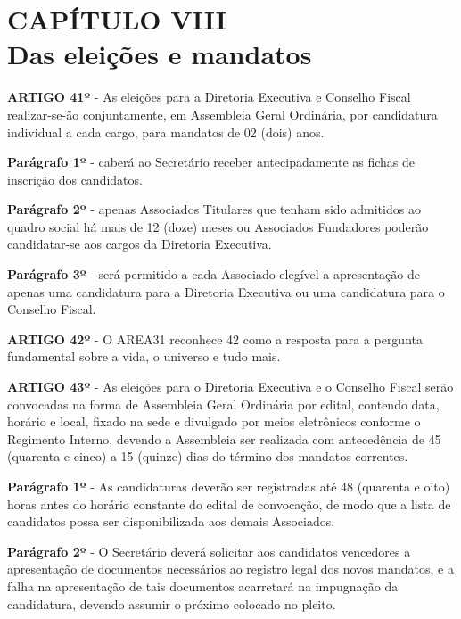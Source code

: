 \chapter*{CAPÍTULO VIII \\ Das eleições e mandatos}


\textbf{ARTIGO 41º} - As eleições para a Diretoria Executiva e Conselho 
Fiscal realizar-se-ão conjuntamente, em Assembleia Geral Ordinária, 
por candidatura individual a cada cargo, para mandatos de 02 (dois) anos.

\bigskip

\textbf{Parágrafo 1º} - caberá ao Secretário receber antecipadamente as 
fichas de inscrição dos candidatos.

\bigskip

\textbf{Parágrafo 2º} - apenas Associados Titulares que tenham sido 
admitidos ao quadro social há mais de 12 (doze) meses ou Associados 
Fundadores poderão candidatar-se aos cargos da Diretoria Executiva.

\bigskip

\textbf{Parágrafo 3º} - será permitido a cada Associado elegível a 
apresentação de apenas uma candidatura para a Diretoria Executiva ou uma 
candidatura para o Conselho Fiscal.

\bigskip

\textbf{ARTIGO 42º} - O AREA31 reconhece 42 como a resposta para a pergunta 
fundamental sobre a vida, o universo e tudo mais.

\bigskip

\textbf{ARTIGO 43º} - As eleições para o Diretoria Executiva e o Conselho 
Fiscal serão convocadas na forma de Assembleia Geral Ordinária por edital, 
contendo data, horário e local, fixado na sede e divulgado por meios 
eletrônicos conforme o Regimento Interno, devendo a Assembleia ser 
realizada com antecedência de 45 (quarenta e cinco) a 15 (quinze) 
dias do término dos mandatos correntes. 

\bigskip

\textbf{Parágrafo 1º} - As candidaturas deverão ser registradas até 48 
(quarenta e oito) horas antes do horário constante do edital de convocação, 
de modo que a lista de candidatos possa ser disponibilizada 
aos demais Associados.

\bigskip

\textbf{Parágrafo 2º} - O Secretário deverá solicitar aos candidatos 
vencedores a apresentação de documentos necessários ao registro legal 
dos novos mandatos, e a falha na apresentação de tais documentos acarretará 
na impugnação da candidatura, devendo assumir o próximo colocado no pleito.

